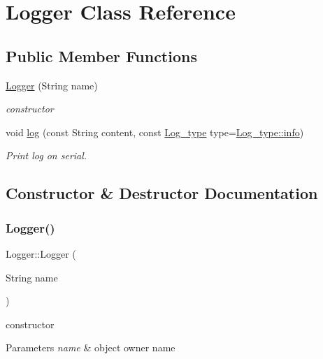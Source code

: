 \hypertarget{class_logger}{}\section{Logger Class Reference}
\label{class_logger}
\subsection*{Public Member Functions}
\begin{DoxyCompactItemize}
\item 
\hyperlink{class_logger_ad458c3e686446dc482ba6bc433da6adc}{Logger} (String name)
\begin{DoxyCompactList}\small\item\em constructor \end{DoxyCompactList}\item 
void \hyperlink{class_logger_a536e1be03317832843ab8bae6c135a95}{log} (const String content, const \hyperlink{_logger_8h_aecc80a60e65b789643a9f14bcead1d57}{Log\+\_\+type} type=\hyperlink{_logger_8h_aecc80a60e65b789643a9f14bcead1d57acaf9b6b99962bf5c2264824231d7a40c}{Log\+\_\+type\+::info})
\begin{DoxyCompactList}\small\item\em Print log on serial. \end{DoxyCompactList}\end{DoxyCompactItemize}


\subsection{Constructor \& Destructor Documentation}
\mbox{\label{class_logger_ad458c3e686446dc482ba6bc433da6adc}} 
\subsubsection{\texorpdfstring{Logger()}{Logger()}}
{\footnotesize\ttfamily Logger\+::\+Logger (\begin{DoxyParamCaption}\item[{String}]{name }\end{DoxyParamCaption})}



constructor 


\begin{DoxyParams}{Parameters}
{\em name} & object owner name \\
\hline
\end{DoxyParams}


